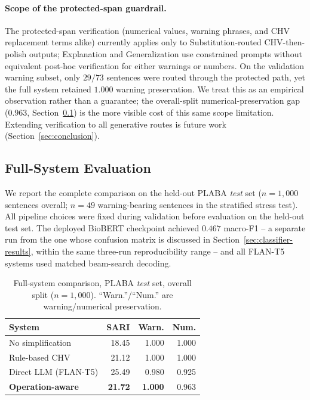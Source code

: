 \documentclass[11pt]{article}
\begin{document}
\paragraph{Scope of the protected-span guardrail.} The protected-span
verification (numerical values, warning phrases, and CHV replacement terms
alike) currently applies only to Substitution-routed CHV-then-polish
outputs; Explanation and Generalization use constrained prompts without
equivalent post-hoc verification for either warnings or numbers. On the
validation warning subset, only $29/73$ sentences were routed through the
protected path, yet the full system retained $1.000$ warning preservation.
We treat this as an empirical observation rather than a guarantee; the
overall-split numerical-preservation gap ($0.963$, Section~\ref{sec:full-eval})
is the more visible cost of this same scope limitation. Extending
verification to all generative routes is future work
(Section~\ref{sec:conclusion}).

\subsection{Full-System Evaluation}
\label{sec:full-eval}

We report the complete comparison on the held-out PLABA \emph{test} set
($n=1{,}000$ sentences overall; $n=49$ warning-bearing sentences in the
stratified stress test). All pipeline choices were fixed during validation
before evaluation on the held-out test set. The deployed BioBERT checkpoint
achieved $0.467$ macro-F1 -- a separate run from the one whose confusion
matrix is discussed in Section~\ref{sec:classifier-results}, within the same
three-run reproducibility range -- and all FLAN-T5 systems used matched
beam-search decoding.

\begin{table}[t]
\centering
\small
\begin{tabular}{lrrr}
\toprule
\textbf{System} & \textbf{SARI} & \textbf{Warn.} & \textbf{Num.} \\
\midrule
No simplification    & 18.45 & 1.000 & 1.000 \\
Rule-based CHV        & 21.12 & 1.000 & 1.000 \\
Direct LLM (FLAN-T5)   & 25.49 & 0.980 & 0.925 \\
\textbf{Operation-aware} & \textbf{21.72} & \textbf{1.000} & 0.963 \\
\bottomrule
\end{tabular}
\caption{Full-system comparison, PLABA \emph{test} set, overall split
($n=1{,}000$). ``Warn.''/``Num.'' are warning/numerical preservation.}
\label{tab:full-results}
\end{table}
\end{document}
